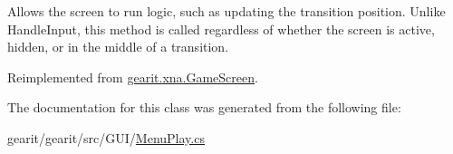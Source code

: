 Allows the screen to run logic, such as updating the transition position. Unlike Handle\+Input, this method is called regardless of whether the screen is active, hidden, or in the middle of a transition. 



Reimplemented from \hyperlink{classgearit_1_1xna_1_1_game_screen_a6bb803502dfbd62b275c2a21d182f88e}{gearit.\+xna.\+Game\+Screen}.



The documentation for this class was generated from the following file\+:\begin{DoxyCompactItemize}
\item 
gearit/gearit/src/\+G\+U\+I/\hyperlink{_menu_play_8cs}{Menu\+Play.\+cs}\end{DoxyCompactItemize}
